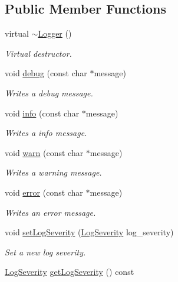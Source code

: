 \subsection*{Public Member Functions}
\begin{CompactItemize}
\item 
\hypertarget{class_assimp_1_1_logger_27dd2bd4fd3b9cde0635ed22aad687c3}{
virtual \hyperlink{class_assimp_1_1_logger_27dd2bd4fd3b9cde0635ed22aad687c3}{$\sim$Logger} ()}
\label{class_assimp_1_1_logger_27dd2bd4fd3b9cde0635ed22aad687c3}

\begin{CompactList}\small\item\em Virtual destructor. \item\end{CompactList}\item 
void \hyperlink{class_assimp_1_1_logger_3b10454ab4c0949f251062376d9c4161}{debug} (const char $\ast$message)
\begin{CompactList}\small\item\em Writes a debug message. \item\end{CompactList}\item 
void \hyperlink{class_assimp_1_1_logger_12b8a125083c47ac0bb6056f00761e52}{info} (const char $\ast$message)
\begin{CompactList}\small\item\em Writes a info message. \item\end{CompactList}\item 
void \hyperlink{class_assimp_1_1_logger_32bc5ee4b23df13551b83b925907f1b1}{warn} (const char $\ast$message)
\begin{CompactList}\small\item\em Writes a warning message. \item\end{CompactList}\item 
void \hyperlink{class_assimp_1_1_logger_a8b7c3f56dc4cecfdacc8bb36ba3fac1}{error} (const char $\ast$message)
\begin{CompactList}\small\item\em Writes an error message. \item\end{CompactList}\item 
void \hyperlink{class_assimp_1_1_logger_8fb4fa4c2c329a36ac39bc9c743925f1}{setLogSeverity} (\hyperlink{class_assimp_1_1_logger_8b6248a0fd062431e8572556350d29e6}{LogSeverity} log\_\-severity)
\begin{CompactList}\small\item\em Set a new log severity. \item\end{CompactList}\item 
\hypertarget{class_assimp_1_1_logger_2b4cee0d7f1f8948308ab6a8ee1a3dc7}{
\hyperlink{class_assimp_1_1_logger_8b6248a0fd062431e8572556350d29e6}{LogSeverity} \hyperlink{class_assimp_1_1_logger_2b4cee0d7f1f8948308ab6a8ee1a3dc7}{getLogSeverity} () const }
\label{class_assimp_1_1_logger_2b4cee0d7f1f8948308ab6a8ee1a3dc7}


\end{CompactItemize}
